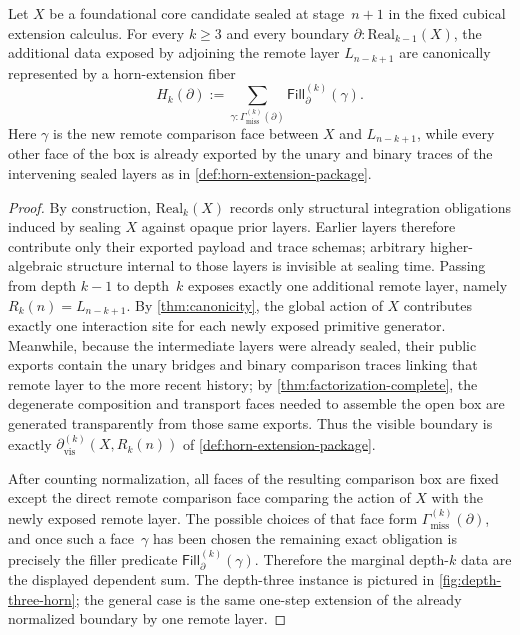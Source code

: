 \documentclass{lmcs}
\newcommand{\Real}{\mathrm{Real}}
\begin{document}
\begin{lem}
\label{lem:horn-reduction}
\label{thm:semantic-horn-reduction}
Let $X$ be a foundational core candidate sealed at stage~$n+1$ in the fixed cubical extension calculus. For every $k \geq 3$ and every boundary $\partial : \Real_{k-1}(X)$, the additional data exposed by adjoining the remote layer $L_{n-k+1}$ are canonically represented by a horn-extension fiber
\[
  H_k(\partial)
  :=
  \sum_{\gamma : \Gamma^{(k)}_{\mathrm{miss}}(\partial)}
  \mathsf{Fill}^{(k)}_{\partial}(\gamma).
\]
Here $\gamma$ is the new remote comparison face between $X$ and $L_{n-k+1}$, while every other face of the box is already exported by the unary and binary traces of the intervening sealed layers as in \autoref{def:horn-extension-package}.
\end{lem}

\begin{proof}
By construction, $\Real_k(X)$ records only structural integration obligations induced by sealing $X$ against opaque prior layers. Earlier layers therefore contribute only their exported payload and trace schemas; arbitrary higher-algebraic structure internal to those layers is invisible at sealing time. Passing from depth $k-1$ to depth~$k$ exposes exactly one additional remote layer, namely $R_k(n)=L_{n-k+1}$. By \autoref{thm:canonicity}, the global action of $X$ contributes exactly one interaction site for each newly exposed primitive generator. Meanwhile, because the intermediate layers were already sealed, their public exports contain the unary bridges and binary comparison traces linking that remote layer to the more recent history; by \autoref{thm:factorization-complete}, the degenerate composition and transport faces needed to assemble the open box are generated transparently from those same exports. Thus the visible boundary is exactly $\partial^{(k)}_{\mathrm{vis}}(X,R_k(n))$ of \autoref{def:horn-extension-package}.

After counting normalization, all faces of the resulting comparison box are fixed except the direct remote comparison face comparing the action of $X$ with the newly exposed remote layer. The possible choices of that face form $\Gamma^{(k)}_{\mathrm{miss}}(\partial)$, and once such a face~$\gamma$ has been chosen the remaining exact obligation is precisely the filler predicate $\mathsf{Fill}^{(k)}_{\partial}(\gamma)$. Therefore the marginal depth-$k$ data are the displayed dependent sum. The depth-three instance is pictured in \autoref{fig:depth-three-horn}; the general case is the same one-step extension of the already normalized boundary by one remote layer.
\end{proof}
\end{document}
